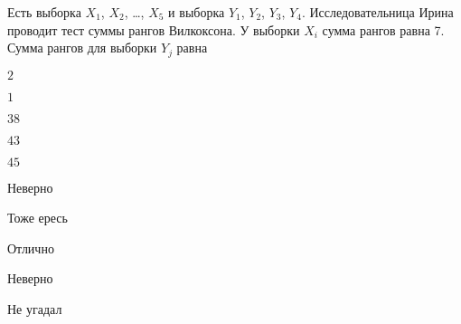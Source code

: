 
\begin{question}
Есть выборка \(X_1\), \(X_2\), \ldots, \(X_5\) и выборка \(Y_1\),
\(Y_2\), \(Y_3\), \(Y_4\). Исследовательница Ирина проводит тест суммы
рангов Вилкоксона. У выборки \(X_i\) сумма рангов равна 7. Сумма рангов
для выборки \(Y_j\) равна
\begin{answerlist}
  \item \(2\)
  \item \(1\)
  \item \(38\)
  \item \(43\)
  \item \(45\)
\end{answerlist}
\end{question}

\begin{solution}
\begin{answerlist}
  \item Неверно
  \item Тоже ересь
  \item Отлично
  \item Неверно
  \item Не угадал
\end{answerlist}
\end{solution}


